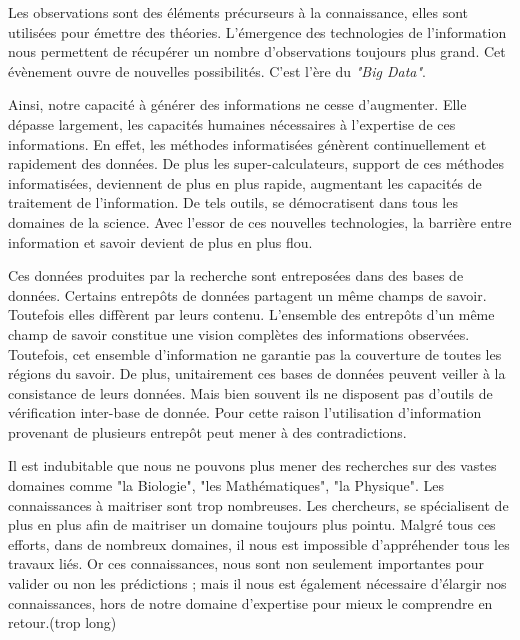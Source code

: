 \begin{refsection}
Les observations sont des éléments précurseurs à la connaissance, elles sont utilisées pour émettre des théories. L'émergence des technologies de l'information nous permettent de récupérer un nombre d'observations toujours plus grand. Cet évènement ouvre de nouvelles possibilités. C'est l'ère du \textit{"Big Data"}.

Ainsi, notre capacité à générer des informations ne cesse d'augmenter. Elle dépasse largement, les capacités humaines nécessaires à l'expertise de ces informations. En effet, les méthodes informatisées génèrent continuellement et rapidement des données. De plus les super-calculateurs, support de ces méthodes informatisées, deviennent de plus en plus rapide, augmentant les capacités de traitement de l'information. De tels outils, se démocratisent dans tous les domaines de la science. Avec l'essor de ces nouvelles technologies, la barrière entre information et savoir devient de plus en plus flou.


Ces données produites par la recherche sont entreposées dans des bases de données. Certains entrepôts de données partagent un même champs de savoir. Toutefois elles diffèrent par leurs contenu. L'ensemble des entrepôts d'un même champ de savoir constitue une vision complètes des informations observées. Toutefois, cet ensemble d'information ne garantie pas la couverture de toutes les régions du savoir. De plus, unitairement ces bases de données peuvent veiller à la consistance de leurs données. Mais bien souvent ils ne disposent pas d'outils de vérification inter-base de donnée. Pour cette raison l'utilisation d'information provenant de plusieurs entrepôt peut mener à des contradictions. 

Il est indubitable que nous ne pouvons plus mener des recherches sur des vastes domaines comme "la Biologie", "les Mathématiques", "la Physique". Les connaissances à maitriser sont trop nombreuses. Les chercheurs, se spécialisent de plus en plus afin de maitriser un domaine toujours plus pointu. Malgré tous ces efforts, dans de nombreux domaines, il nous est impossible d'appréhender tous les travaux liés. Or ces connaissances, nous sont non seulement
importantes pour valider ou non les prédictions ; mais il nous est également nécessaire d'élargir nos connaissances, hors de notre domaine d'expertise pour mieux le comprendre en retour.(trop long)


\end{refsection}
